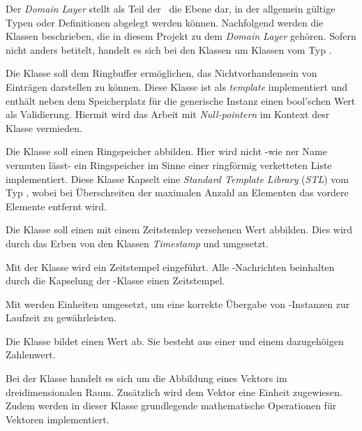 
Der \textit{Domain Layer} stellt als Teil der \clean\ die Ebene dar, in der allgemein gültige Typen oder Definitionen abgelegt werden können. Nachfolgend werden die Klassen beschrieben, die in diesem Projekt zu dem \textit{Domain Layer} gehören. Sofern nicht anders betitelt, handelt es sich bei den Klassen um Klassen vom Typ \VO.



Die Klasse  soll dem Ringbuffer ermöglichen, das Nichtvorhandensein von Einträgen darstellen zu können. Diese Klasse ist als \textit{template} implementiert und enthält neben dem Speicherplatz für die generische Instanz einen bool'schen Wert als Validierung.
Hiermit wird das Arbeit mit \textit{Null-pointern} im Kontext desr Klasse  vermieden.


Die Klasse  soll einen Ringspeicher abbilden. Hier wird nicht -wie ner Name vermuten lässt- ein Ringspeicher im Sinne einer ringförmig verketteten Liste implementiert. Diese Klasse Kapselt eine \textit{Standard Template Library} (\textit{STL}) vom Typ , wobei bei Überschreiten der maximalen Anzahl an Elementen das vordere Elemente entfernt wird.



Die Klasse  soll einen mit einem Zeitstemlep versehenen Wert abbilden. Dies wird durch das Erben von den Klassen \textit{Timestamp} und  umgesetzt.



Mit der Klasse  wird ein Zeitstempel eingeführt. Alle \ROS-Nachrichten beinhalten durch die Kapselung der -Klasse einen Zeitstempel.


Mit  werden Einheiten umgesetzt, um eine korrekte Übergabe von -Instanzen zur Laufzeit zu gewährleisten.


Die Klasse  bildet einen Wert ab. Sie besteht aus einer  und einem dazugehöigen Zahlenwert.


Bei der Klasse  handelt es sich um die Abbildung eines Vektors im dreidimensionalen Raum. Zusätzlich wird dem Vektor eine Einheit zugewiesen.
Zudem werden in dieser Klasse grundlegende mathematische Operationen für Vektoren implementiert.





